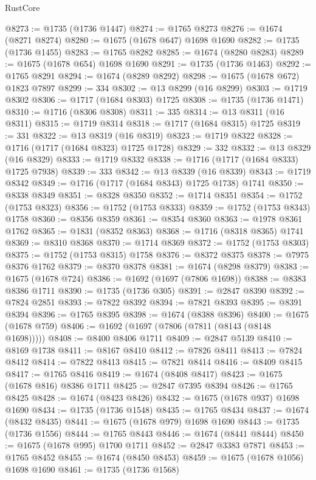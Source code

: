 \begin{lexlean}{RustCore}
\begin{coremodule}
@8273 := @1735 (@1736 @1447)
@8274 := @1765 @8273
@8276 := @1674 (@8271 @8274)
@8280 := @1675 (@1678 @647) @1698 @1690
@8282 := @1735 (@1736 @1455)
@8283 := @1765 @8282
@8285 := @1674 (@8280 @8283)
@8289 := @1675 (@1678 @654) @1698 @1690
@8291 := @1735 (@1736 @1463)
@8292 := @1765 @8291
@8294 := @1674 (@8289 @8292)
@8298 := @1675 (@1678 @672) @1823 @7897
@8299 := 334
@8302 := @13 @8299 (@16 @8299)
@8303 := @1719 @8302
@8306 := @1717 (@1684 @8303) @1725
@8308 := @1735 (@1736 @1471)
@8310 := @1716 (@8306 @8308)
@8311 := 335
@8314 := @13 @8311 (@16 @8311)
@8315 := @1719 @8314
@8318 := @1717 (@1684 @8315) @1725
@8319 := 331
@8322 := @13 @8319 (@16 @8319)
@8323 := @1719 @8322
@8328 := @1716 (@1717 (@1684 @8323) @1725 @1728)
@8329 := 332
@8332 := @13 @8329 (@16 @8329)
@8333 := @1719 @8332
@8338 := @1716 (@1717 (@1684 @8333) @1725 @7938)
@8339 := 333
@8342 := @13 @8339 (@16 @8339)
@8343 := @1719 @8342
@8349 := @1716 (@1717 (@1684 @8343) @1725 @1738) @1741
@8350 := @8338 @8349
@8351 := @8328 @8350
@8352 := @1714 @8351
@8354 := @1752 (@1753 @8323)
@8356 := @1752 (@1753 @8333)
@8359 := @1752 (@1753 @8343) @1758
@8360 := @8356 @8359
@8361 := @8354 @8360
@8363 := @1978 @8361 @1762
@8365 := @1831 (@8352 @8363)
@8368 := @1716 (@8318 @8365) @1741
@8369 := @8310 @8368
@8370 := @1714 @8369
@8372 := @1752 (@1753 @8303)
@8375 := @1752 (@1753 @8315) @1758
@8376 := @8372 @8375
@8378 := @7975 @8376 @1762
@8379 := @8370 @8378
@8381 := @1674 (@8298 @8379)
@8383 := @1675 (@1678 @724)
@8386 := @1692 (@1697 (@7806 @1698))
@8388 := @8383 @8386 @1711
@8390 := @1735 (@1736 @305)
@8391 := @2847 @8390
@8392 := @7824 @2851
@8393 := @7822 @8392
@8394 := @7821 @8393
@8395 := @8391 @8394
@8396 := @1765 @8395
@8398 := @1674 (@8388 @8396)
@8400 := @1675 (@1678 @759)
@8406 := @1692 (@1697 (@7806 (@7811 (@8143 (@8148 @1698)))))
@8408 := @8400 @8406 @1711
@8409 := @2847 @5139
@8410 := @8169 @1738
@8411 := @8167 @8410
@8412 := @7826 @8411
@8413 := @7824 @8412
@8414 := @7822 @8413
@8415 := @7821 @8414
@8416 := @8409 @8415
@8417 := @1765 @8416
@8419 := @1674 (@8408 @8417)
@8423 := @1675 (@1678 @816) @8386 @1711
@8425 := @2847 @7395 @8394
@8426 := @1765 @8425
@8428 := @1674 (@8423 @8426)
@8432 := @1675 (@1678 @937) @1698 @1690
@8434 := @1735 (@1736 @1548)
@8435 := @1765 @8434
@8437 := @1674 (@8432 @8435)
@8441 := @1675 (@1678 @979) @1698 @1690
@8443 := @1735 (@1736 @1556)
@8444 := @1765 @8443
@8446 := @1674 (@8441 @8444)
@8450 := @1675 (@1678 @995) @1700 @1711
@8452 := @2847 @3383 @7871
@8453 := @1765 @8452
@8455 := @1674 (@8450 @8453)
@8459 := @1675 (@1678 @1056) @1698 @1690
@8461 := @1735 (@1736 @1568)

\end{coremodule}
\end{lexlean}
